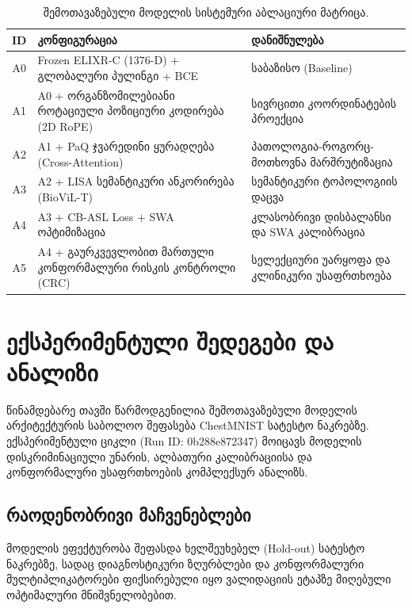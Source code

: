 \documentclass[12pt,a4paper,oneside]{report}
\begin{document}
\begin{table}[H]
\centering
\caption{შემოთავაზებული მოდელის სისტემური აბლაციური მატრიცა.}
\label{tab:ablation_matrix}
\begin{tabularx}{\textwidth}{c L >{\raggedright\arraybackslash}p{0.25\textwidth}}
\toprule
\textbf{ID} & \textbf{კონფიგურაცია} & \textbf{დანიშნულება} \\
\midrule
A0 & Frozen ELIXR-C (1376-D) + გლობალური პულინგი + BCE & საბაზისო (Baseline) \\
A1 & A0 + ორგანზომილებიანი როტაციული პოზიციური კოდირება (2D RoPE) & სივრცითი კოორდინატების პროექცია \\
A2 & A1 + PaQ ჯვარედინი ყურადღება (Cross-Attention) & პათოლოგია-როგორც-მოთხოვნა მარშრუტიზაცია \\
A3 & A2 + LISA სემანტიკური ანკორირება (BioViL-T) & სემანტიკური ტოპოლოგიის დაცვა \\
A4 & A3 + CB-ASL Loss + SWA ოპტიმიზაცია & კლასობრივი დისბალანსი და SWA კალიბრაცია \\
A5 & A4 + გაურკვევლობით მართული კონფორმალური რისკის კონტროლი (CRC) & სელექციური უარყოფა და კლინიკური უსაფრთხოება \\
\bottomrule
\end{tabularx}
\end{table}

\chapter{ექსპერიმენტული შედეგები და ანალიზი}

წინამდებარე თავში წარმოდგენილია შემოთავაზებული მოდელის არქიტექტურის საბოლოო შეფასება ChestMNIST სატესტო ნაკრებზე. ექსპერიმენტული ციკლი (Run ID: 0b288e872347) მოიცავს მოდელის დისკრიმინაციული უნარის, ალბათური კალიბრაციისა და კონფორმალური უსაფრთხოების კომპლექსურ ანალიზს.

\section{რაოდენობრივი მაჩვენებლები}
მოდელის ეფექტურობა შეფასდა ხელშეუხებელ (Hold-out) სატესტო ნაკრებზე, სადაც დიაგნოსტიკური ზღურბლები და კონფორმალური მულტიპლიკატორები ფიქსირებული იყო ვალიდაციის ეტაპზე მიღებული ოპტიმალური მნიშვნელობებით.
\end{document}
